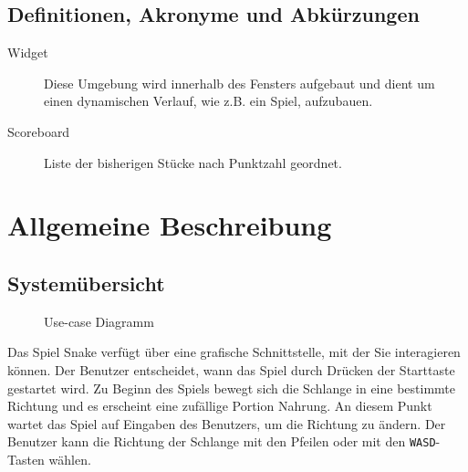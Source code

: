 \documentclass[a4paper, twosided, 11pt]{scrartcl}
\begin{document}

\subsection{Definitionen, Akronyme und Abk\"urzungen}

\begin{description}
  \item[Widget] Diese Umgebung wird innerhalb des Fensters aufgebaut und dient
    um einen dynamischen Verlauf, wie z.B. ein Spiel, aufzubauen.
  \item[Scoreboard] Liste der bisherigen Stücke nach Punktzahl geordnet.
\end{description}

\section{Allgemeine Beschreibung}
\subsection{System\"ubersicht}
\begin{figure}[h]
  \centering
  
  \caption{Use-case Diagramm}
\end{figure}

Das Spiel Snake verfügt über eine grafische Schnittstelle, mit der Sie
interagieren können.  Der Benutzer entscheidet, wann das Spiel durch Drücken
der Starttaste gestartet wird.  Zu Beginn des Spiels bewegt sich die Schlange
in eine bestimmte Richtung und es erscheint eine zufällige Portion Nahrung.  An
diesem Punkt wartet das Spiel auf Eingaben des Benutzers, um die Richtung zu
ändern. Der Benutzer kann die Richtung der Schlange mit den Pfeilen oder mit
den \texttt{WASD}-Tasten wählen. 
\end{document}
